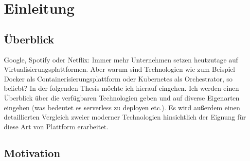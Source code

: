\chapter{Einleitung \checkmark}

\section{\"Uberblick \checkmark}

Google, Spotify oder Netflix: Immer mehr Unternehmen setzen heutzutage auf Virtualisierungsplattformen. Aber warum sind Technologien wie zum Beispiel Docker als Containerisierungsplattform oder Kubernetes als Orchestrator, so beliebt? In der folgenden Thesis möchte ich hierauf eingehen. Ich werden einen Überblick über die verfügbaren Technologien geben und auf diverse Eigenarten eingehen (was bedeutet es serverless zu deployen etc.). Es wird außerdem einen detaillierten Vergleich zweier moderner Technologien hinsichtlich der Eignung für diese Art von Plattform erarbeitet.


\section{Motivation \checkmark}

